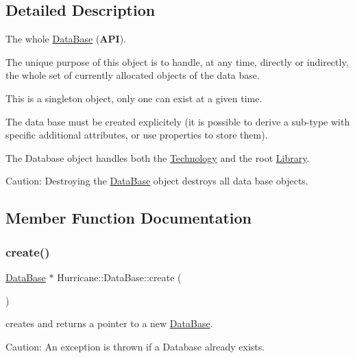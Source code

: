 \subsection{Detailed Description}
The whole \hyperlink{classHurricane_1_1DataBase}{Data\+Base} ({\bfseries A\+PI}). 

The unique purpose of this object is to handle, at any time, directly or indirectly, the whole set of currently allocated objects of the data base.

This is a singleton object, only one can exist at a given time.

The data base must be created explicitely (it is possible to derive a sub-\/type with specific additional attributes, or use properties to store them).

The Database object handles both the \hyperlink{classHurricane_1_1Technology}{Technology} and the root \hyperlink{classHurricane_1_1Library}{Library}.

\begin{DoxyParagraph}{Caution\+:}
Destroying the \hyperlink{classHurricane_1_1DataBase}{Data\+Base} object destroys all data base objects. 
\end{DoxyParagraph}


\subsection{Member Function Documentation}
\mbox{\label{classHurricane_1_1DataBase_af0210f9bb13faf06e12eb135eeea9b06}} 
\subsubsection{\texorpdfstring{create()}{create()}}
{\footnotesize\ttfamily \hyperlink{classHurricane_1_1DataBase}{Data\+Base} $\ast$ Hurricane\+::\+Data\+Base\+::create (\begin{DoxyParamCaption}{ }\end{DoxyParamCaption})\hspace{0.3cm}{\ttfamily [static]}}

creates and returns a pointer to a new \hyperlink{classHurricane_1_1DataBase}{Data\+Base}.

\begin{DoxyParagraph}{Caution\+:}
An exception is thrown if a Database already exists. 
\end{DoxyParagraph}
\mbox{\label{classHurricane_1_1DataBase_a144480c54b0f9fbda57622ad6767ab8a}} 
